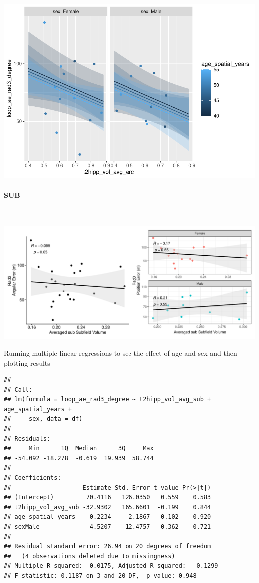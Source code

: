 \documentclass[
]{article}
\begin{document}
\includegraphics{hippocampal_subfield_files/figure-latex/Avg ERC + rad3 angular errorMLR-1.pdf}
\vspace{1cm}

\newpage
\paragraph{SUB}

~ \vspace{1cm}

\includegraphics{hippocampal_subfield_files/figure-latex/unnamed-chunk-14-1.pdf}

\vspace{1cm}

Running multiple linear regressions to see the effect of age and sex and
then plotting results

\begin{verbatim}
## 
## Call:
## lm(formula = loop_ae_rad3_degree ~ t2hipp_vol_avg_sub + age_spatial_years + 
##     sex, data = df)
## 
## Residuals:
##     Min      1Q  Median      3Q     Max 
## -54.092 -18.278  -0.619  19.939  58.744 
## 
## Coefficients:
##                    Estimate Std. Error t value Pr(>|t|)
## (Intercept)         70.4116   126.0350   0.559    0.583
## t2hipp_vol_avg_sub -32.9302   165.6601  -0.199    0.844
## age_spatial_years    0.2234     2.1867   0.102    0.920
## sexMale             -4.5207    12.4757  -0.362    0.721
## 
## Residual standard error: 26.94 on 20 degrees of freedom
##   (4 observations deleted due to missingness)
## Multiple R-squared:  0.0175, Adjusted R-squared:  -0.1299 
## F-statistic: 0.1187 on 3 and 20 DF,  p-value: 0.948
\end{verbatim}
\end{document}
